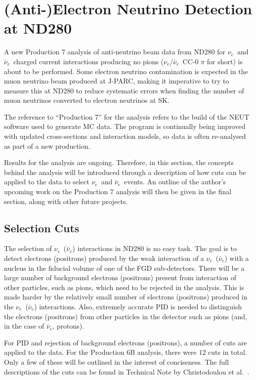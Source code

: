 \documentclass[aps,pra,12pt,notitlepage,tightenlines]{revtex4-1}
\newcommand{\nue}{$\nu_e$}
\newcommand{\anue}{$\bar\nu_e$}
\begin{document}
\section{\mbox{(Anti-)Electron} Neutrino Detection at ND280}
A new Production 7 analysis of anti-neutrino beam data from ND280 for \nue \ and \anue \ charged current interactions producing no pions (\nue/\anue \ CC-0 $\pi$ for short) is about to be performed. Some electron neutrino contamination is expected in the muon neutrino beam produced at J-PARC, making it imperative to try to measure this at ND280 to reduce systematic errors when finding the number of muon neutrinos converted to electron neutrinos at SK.

The reference to ``Production 7'' for the analysis refers to the build of the NEUT software used to generate MC data. The program is continually being improved with updated cross-sections and interaction models, so data is often re-analysed as part of a new production.

Results for the analysis are ongoing. Therefore, in this section, the concepts behind the analysis will be introduced through a description of how cuts can be applied to the data to select \nue \ and \anue \ events. An outline of the author's upcoming work on the Production 7 analysis will then be given in the final section, along with other future projects.

\subsection{Selection Cuts}
The selection of \nue \ (\anue) interactions in ND280 is no easy task. The goal is to detect electrons (positrons) produced by the weak interaction of a \nue \ (\anue) with a nucleus in the fiducial volume of one of the FGD sub-detectors. There will be a large number of background electrons (positrons) present from interaction of other particles, such as pions, which need to be rejected in the analysis. This is made harder by the relatively small number of electrons (positrons) produced in the \nue \ (\anue) interactions. Also, extremely accurate PID is needed to distinguish the electrons (positrons) from other particles in the detector such as pions (and, in the case of \anue , protons).

For PID and rejection of background electrons (positrons), a number of cuts are applied to the data. For the Production 6B analysis, there were 12 cuts in total. Only a few of these will be outlined in the interest of conciseness. The full descriptions of the cuts can be found in Technical Note  by Christodoulou et al.~\cite{Christodoulou2017}. 
\end{document}
